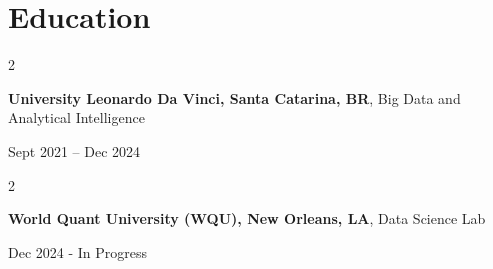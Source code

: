 \documentclass[10pt, letterpaper]{article}
\newenvironment{twocolentry}[2][]{
    \onecolentry
    \def\secondColumn{#2}
    \setcolumnwidth{\fill, 4.5 cm}
    \begin{paracol}{2}
}{
    \switchcolumn \raggedleft \secondColumn
    \end{paracol}
    \endonecolentry
} %
\begin{document}
     \section{Education}
      
        \begin{twocolentry}{
            Sept 2021 – Dec 2024
        }
            \textbf{University Leonardo Da Vinci, Santa Catarina, BR}, Big Data and Analytical Intelligence
            
        \end{twocolentry}
        
        \vspace{0.10 cm}

        \begin{twocolentry}{
             Dec 2024 - In Progress
        }
            \textbf{World Quant University (WQU), New Orleans, LA}, Data Science Lab
            
        \end{twocolentry}

        \vspace{0.10 cm}    
\end{document}
